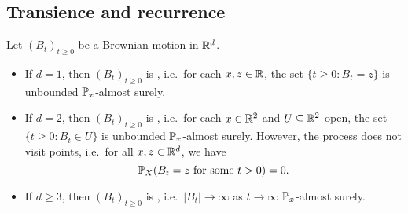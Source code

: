 \documentclass[a4paper]{article}
\begin{document}
\subsection{Transience and recurrence}
\begin{thm}
  Let $(B_t)_{t \geq 0}$ be a Brownian motion in $\R^d$.
  \begin{itemize}
    \item If $d = 1$, then $(B_t)_{t \geq 0}$ is , i.e.\ for each $x, z \in \R$, the set $\{t \geq 0: B_t = z\}$ is unbounded $\P_x$-almost surely.
    \item If $d = 2$, then $(B_t)_{t \geq 0}$ is , i.e.\ for each $x \in \R^2$ and $U \subseteq \R^2$ open, the set $\{t \geq 0: B_t \in U\}$ is unbounded $\P_x$-almost surely. However, the process does not visit points, i.e.\ for all $x, z \in \R^d$, we have
      \[
        \P_X(B_t = z\text{ for some }t > 0) = 0.
      \]
    \item If $d \geq 3$, then $(B_t)_{t \geq 0}$ is , i.e.\ $|B_t| \to \infty$ as $t\to \infty$ $\P_x$-almost surely.
  \end{itemize}
\end{thm}
\end{document}
